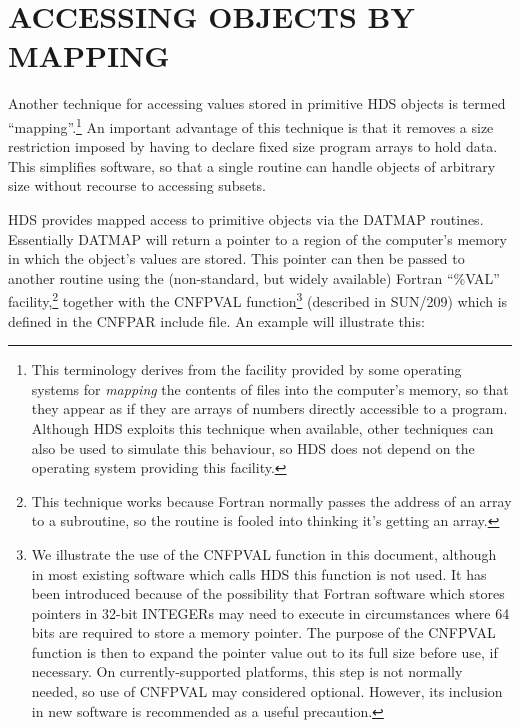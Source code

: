 \documentclass[twoside,11pt]{article}
\newcommand{\htmlref}[2]{#1}
\newcommand{\xref}[3]{#1}
\newcommand{\xlabel}[1]{}
\renewcommand{\_}{\texttt{\symbol{95}}}
\newcommand{\qt}[1]{``#1''}
\newcommand{\st}[1]{{\em{#1}}}
\newcommand{\qt}[1]{{\tt{"}}#1{\tt{"}}}
\begin{document}
\section{\xlabel{mapping_data}\label{sect:mapping}ACCESSING OBJECTS BY MAPPING}

Another technique for accessing values stored in primitive HDS objects
is termed \qt{mapping}.\footnote{This terminology derives from the
facility provided by some operating systems for \st{mapping} the
contents of files into the computer's memory, so that they appear as
if they are arrays of numbers directly accessible to a
program. Although HDS exploits this technique when available, other
techniques can also be used to simulate this behaviour, so HDS does
not depend on the operating system providing this facility.} An
important advantage of this technique is that it removes a size
restriction imposed by having to declare fixed size program arrays to
hold data. This simplifies software, so that a single routine can
handle objects of arbitrary size without recourse to accessing
subsets.

HDS provides mapped access to primitive objects via the DAT\_MAP
routines. Essentially \htmlref{DAT\_MAP}{DAT_MAP} will return a
pointer to a region of the computer's memory in which the object's
values are stored. This pointer can then be passed to another routine
using the (non-standard, but widely available) Fortran \qt{\%VAL}
facility,\footnote{This technique works because Fortran normally
passes the address of an array to a subroutine, so the routine is
fooled into thinking it's getting an array.} together with the
\xref{CNF\_PVAL}{sun209}{CNF_PVAL} function\footnote{We illustrate the
use of the \xref{CNF\_PVAL}{sun209}{CNF_PVAL} function in this
document, although in most existing software which calls HDS this
function is not used. It has been introduced because of the
possibility that Fortran software which stores pointers in 32-bit
INTEGERs may need to execute in circumstances where 64 bits are
required to store a memory pointer. The purpose of the CNF\_PVAL
function is then to expand the pointer value out to its full size
before use, if necessary. On currently-supported platforms, this step
is not normally needed, so use of CNF\_PVAL may considered
optional. However, its inclusion in new software is recommended as a
useful precaution.} (described in \xref{SUN/209}{sun209}{}) which is
defined in the CNF\_PAR include file.  An example will illustrate
this:
\end{document}
